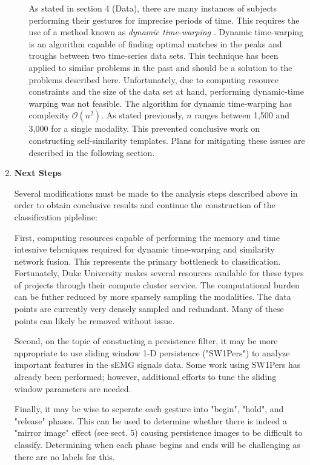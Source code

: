 \documentclass[11pt]{article}
\begin{document}
\begin{enumerate}
\begin{enumerate}
As stated in section 4 (Data), there are many instances of subjects performing their gestures for imprecise periods of time. This requires the use of a method known as \emph{dynamic time-warping} \cite{dtw}. Dynamic time-warping is an algorithm capable of finding optimal matches in the peaks and troughs between two time-series data sets. This technique has been applied to similar problems in the past and should be a solution to the problems described here. Unfortunately, due to computing resource constraints and the size of the data set at hand, performing dynamic-time warping was not feasible. The algorithm for dynamic time-warping has complexity $\mathcal{O}(n^2)$. As stated previously, $n$ ranges between 1,500 and 3,000 for a single modality. This prevented conclusive work on constructing self-similarity templates. Plans for mitigating these issues are described in the following section.

\end{enumerate}


\item \textbf{Next Steps}

Several modifications must be made to the analysis steps described above in order to obtain conclusive results and continue the construction of the classification pipleline:

First, computing resources capable of performing the memory and time intesnive tehcniques required for dynamic time-warping and similarity network fusion. This represents the primary bottleneck to classification. Fortunately, Duke University makes several resources available for these types of projects through their compute cluster service. The computational burden can be futher reduced by more sparsely sampling the modalities. The data points are currently very densely sampled and redundant. Many of these points can likely be removed without issue.

Second, on the topic of constucting a persistence filter, it may be more appropriate to use sliding window 1-D persistence ("SW1Pers") to analyze important features in the sEMG signals data. Some work using SW1Pers has already been performed; however, additional efforts to tune the sliding window parameters are needed.

Finally, it may be wise to seperate each gesture into "begin", "hold", and "release" phases. This can be used to determine whether there is indeed a "mirror image" effect (see sect. 5) causing persistence images to be difficult to classify. Determining when each phase begins and ends will be challenging as there are no labels for this.



\end{enumerate}
\end{document}
